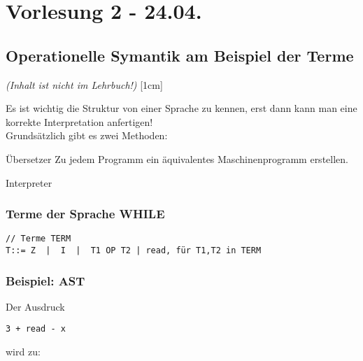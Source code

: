 \section{Vorlesung 2 - 24.04.}
\subsection{Operationelle Symantik am Beispiel der Terme}
\emph{(Inhalt ist nicht im Lehrbuch!)}
[1cm]

Es ist wichtig die Struktur von einer Sprache zu kennen, erst dann kann man eine korrekte Interpretation anfertigen!\\
Grundsätzlich gibt es zwei Methoden:
\begin{compactitem}
	\item[Übersetzer] Zu jedem Programm ein äquivalentes Maschinenprogramm erstellen.
		
	\item[Interpreter]
\end{compactitem}
\subsubsection{Terme der Sprache WHILE}
\begin{lstlisting}
// Terme TERM
T::= Z  |  I  |  T1 OP T2 | read, für T1,T2 in TERM
\end{lstlisting}

\subsubsection{Beispiel: AST}
Der Ausdruck
\begin{lstlisting}
3 + read - x 
\end{lstlisting}
wird zu:\\

